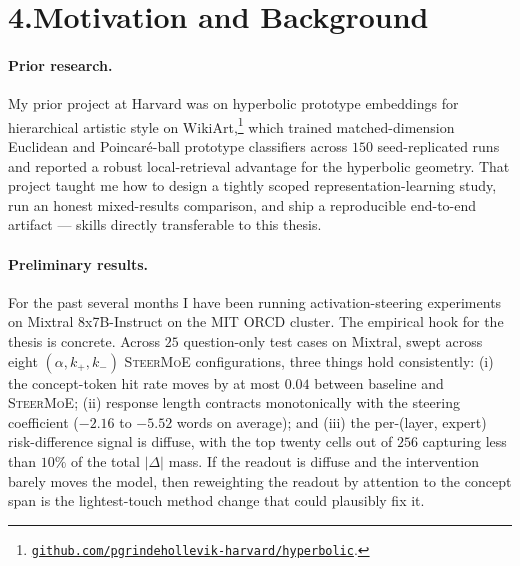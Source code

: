 \documentclass[11pt]{article}
\begin{document}
\section*{4.\quad Motivation and Background}

\paragraph{Prior research.}
My prior project at Harvard was on hyperbolic prototype embeddings for
hierarchical artistic style on
WikiArt,\footnote{\href{https://github.com/pgrindehollevik-harvard/hyperbolic}{\texttt{github.com/pgrindehollevik-harvard/hyperbolic}}.}
which trained matched-dimension Euclidean and Poincar\'e-ball prototype
classifiers across $150$ seed-replicated runs and reported a robust
local-retrieval advantage for the hyperbolic geometry. That project
taught me how to design a tightly scoped representation-learning
study, run an honest mixed-results comparison, and ship a
reproducible end-to-end artifact --- skills directly transferable to
this thesis.

\paragraph{Preliminary results.}
For the past several months I have been running activation-steering
experiments on Mixtral 8x7B-Instruct on the MIT ORCD cluster.
The empirical hook for the thesis is concrete. Across $25$
question-only test cases on Mixtral, swept across eight
$(\alpha, k_+, k_-)$ \textsc{SteerMoE} configurations, three things
hold consistently: (i) the concept-token hit rate moves by at most
$0.04$ between baseline and \textsc{SteerMoE}; (ii) response length
contracts monotonically with the steering coefficient
($-2.16$ to $-5.52$ words on average); and (iii) the
per-(layer, expert) risk-difference signal is diffuse, with the top
twenty cells out of $256$ capturing less than $10\%$ of the total
$|\Delta|$ mass. If the readout is diffuse and the intervention barely
moves the model, then reweighting the readout by attention to the
concept span is the lightest-touch method change that could
plausibly fix it.
\end{document}
